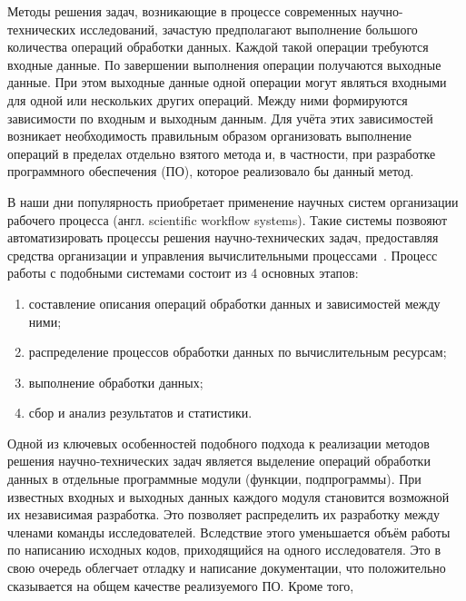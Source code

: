 \def\notedate{2022.04.13}
\def\currentauthor{Тришин И.В. (РК6-81Б)}
Методы решения задач, возникающие в процессе современных научно-технических исследований, зачастую предполагают выполнение большого количества операций обработки данных. Каждой такой операции требуются входные данные. По завершении выполнения операции получаются выходные данные. При этом выходные данные одной операции могут являться входными для одной или нескольких других операций. Между ними формируются зависимости по входным и выходным данным. Для учёта этих зависимостей возникает необходимость правильным образом организовать выполнение операций в пределах отдельно взятого метода и, в частности, при разработке программного обеспечения (ПО), которое реализовало бы данный метод. 

В наши дни популярность приобретает применение научных систем организации рабочего процесса (англ. scientific workflow systems). Такие системы позвояют автоматизировать процессы решения научно-технических задач, предоставляя средства организации и управления вычислительными процессами~\cite{DeelmanWorkflow2009}. Процесс работы с подобными системами состоит из 4 основных этапов:
\begin{enumerate}
    \item составление описания операций обработки данных и зависимостей между ними;
    \item распределение процессов обработки данных по вычислительным ресурсам;
    \item выполнение обработки данных;
    \item сбор и анализ результатов и статистики.
\end{enumerate}

Одной из ключевых особенностей подобного подхода к реализации методов решения научно-технических задач является выделение операций обработки данных в отдельные программные модули (функции, подпрограммы). При известных входных и выходных данных каждого модуля становится возможной их независимая разработка\cite{DanilovPar2011}. Это позволяет распределить их разработку между членами команды исследователей. Вследствие этого уменьшается объём работы по написанию исходных кодов, приходящийся на одного исследователя. Это в свою очередь облегчает отладку и написание документации, что положительно сказывается на общем качестве реализуемого ПО. Кроме того, 